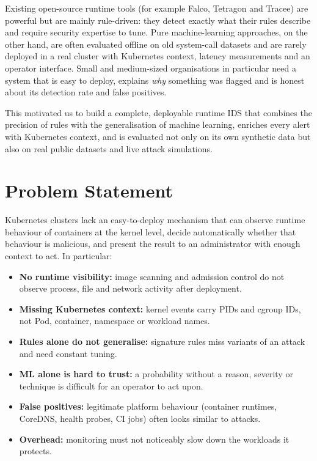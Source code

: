 Existing open-source runtime tools (for example Falco, Tetragon and Tracee) are
powerful but are mainly rule-driven: they detect exactly what their rules describe and
require security expertise to tune. Pure machine-learning approaches, on the other
hand, are often evaluated offline on old system-call datasets and are rarely deployed
in a real cluster with Kubernetes context, latency measurements and an operator
interface. Small and medium-sized organisations in particular need a system that is
easy to deploy, explains \emph{why} something was flagged and is honest about its
detection rate and false positives.

This motivated us to build a complete, deployable runtime IDS that combines the
precision of rules with the generalisation of machine learning, enriches every alert
with Kubernetes context, and is evaluated not only on its own synthetic data but also
on real public datasets and live attack simulations.

\section{Problem Statement}

Kubernetes clusters lack an easy-to-deploy mechanism that can observe runtime
behaviour of containers at the kernel level, decide automatically whether that
behaviour is malicious, and present the result to an administrator with enough context
to act. In particular:
\begin{itemize}
    \item \textbf{No runtime visibility:} image scanning and admission control do not
          observe process, file and network activity after deployment.
    \item \textbf{Missing Kubernetes context:} kernel events carry PIDs and cgroup IDs,
          not Pod, container, namespace or workload names.
    \item \textbf{Rules alone do not generalise:} signature rules miss variants of an
          attack and need constant tuning.
    \item \textbf{ML alone is hard to trust:} a probability without a reason, severity or
          technique is difficult for an operator to act upon.
    \item \textbf{False positives:} legitimate platform behaviour (container runtimes,
          CoreDNS, health probes, CI jobs) often looks similar to attacks.
    \item \textbf{Overhead:} monitoring must not noticeably slow down the workloads it
          protects.
\end{itemize}


